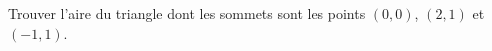 
\begin{exercice}\label{exoOutilsMath-0070}

    Trouver l'aire du triangle dont les sommets sont les points $(0,0)$, $(2,1)$ et $(-1,1)$.

\end{exercice}
